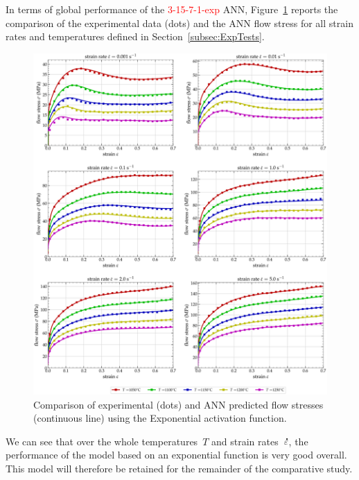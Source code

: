 \documentclass[algorithms,article,submit,pdftex,oneauthors]{Definitions/mdpi}
\DeclareRobustCommand{\mdot}[1]{\accentset{\mbox{\bfseries .}}{#1}}
\begin{document}
In terms of global performance of the \textcolor{red}{3-15-7-1-exp} ANN, Figure~\ref{fig:ANN-ExpFit} reports the comparison of the experimental data (dots) and the ANN flow stress for all strain rates and temperatures defined in Section~\ref{subsec:ExpTests}.
\begin{figure}[h!]
\centering
\includegraphics[width=0.95\columnwidth]{Figures/3Cr2Mo-3-15-7-1-exponential}
\caption{Comparison of experimental (dots) and ANN predicted flow stresses (continuous line) using the Exponential activation function.}
\label{fig:ANN-ExpFit}
\end{figure}
We can see that over the whole temperatures~$T$ and strain rates~$\mdot{\varepsilon}$, the performance of the model based on an exponential function is very good overall.
This model will therefore be retained for the remainder of the comparative study.
\end{document}
